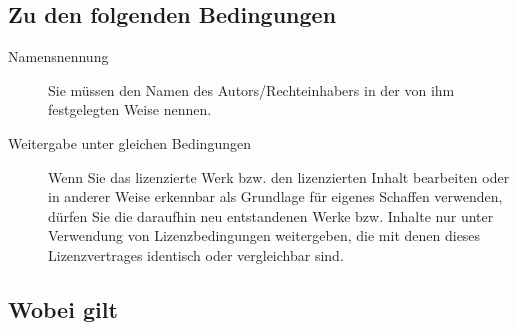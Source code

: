 \subsection*{Zu den folgenden Bedingungen}

\begin{description}
 \item[Namensnennung] Sie müssen den Namen des Autors/Rechteinhabers in der von ihm 
festgelegten Weise nennen.

 \item[Weitergabe unter gleichen Bedingungen] Wenn Sie das lizenzierte Werk bzw. den 
lizenzierten Inhalt bearbeiten oder in anderer Weise erkennbar als Grundlage für 
eigenes Schaffen verwenden, dürfen Sie die daraufhin neu entstandenen Werke bzw. 
Inhalte nur unter Verwendung von Lizenzbedingungen weitergeben, die mit denen dieses 
Lizenzvertrages identisch oder vergleichbar sind.
 \end{description}

\subsection*{Wobei gilt}

